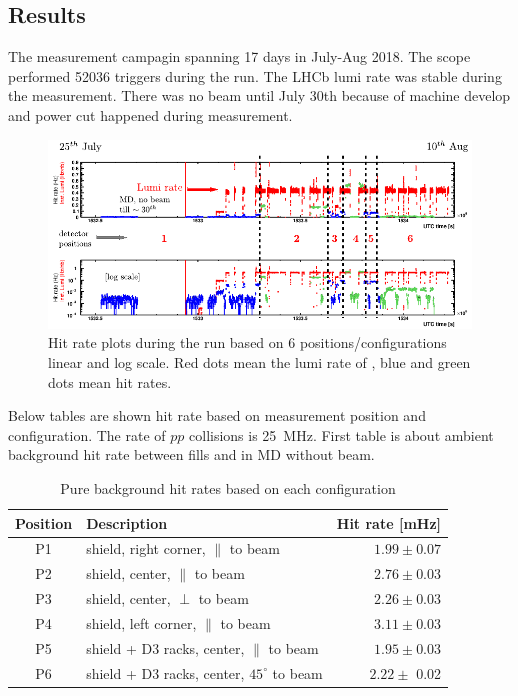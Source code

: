 \subsection{Results}

The measurement campagin spanning 17 days in July-Aug 2018.
The scope performed 52036 triggers during the run.
The LHCb lumi rate was stable during the measurement.
There was no beam until July 30th because of machine develop and power cut happened during measurement.

\vspace{0.2cm}
\begin{figure}[h]
\centering
    \includegraphics[width=12cm]{figs/INT/codexb_data_global.pdf}
\caption{
    Hit rate plots during the run based on 6 positions/configurations linear and log scale. Red dots mean the lumi rate of \lhcb, blue and green dots mean hit rates.
}
\end{figure}

Below tables are shown hit rate based on measurement position and configuration.
The rate of $pp$ collisions is 25~MHz.
First table is about ambient background hit rate between fills and in MD without beam.

\begin{table}
\begin{center}
\begin{tabular}{c|l|r}
  Position & \hspace{2cm}Description & Hit rate [mHz] \\
  \hline \hline
   P1 & shield, right corner, $\parallel$ to beam& $1.99\pm0.07$ \\ \hline
   P2 & shield, center, $\parallel$ to beam&  $2.76\pm 0.03$ \\ \hline
   P3 & shield, center, $\perp$ to beam& $ 2.26\pm 0.03$ \\ \hline
   P4 & shield, left corner, $\parallel$ to beam& $ 3.11\pm 0.03$ \\ \hline
   P5 & shield + D3 racks, center, $\parallel$ to beam& $ 1.95\pm 0.03$ \\ \hline
   P6 & shield + D3 racks, center, $45^\circ$ to beam& $ 2.22\pm $ 0.02\\ \hline
\end{tabular}
\caption{
    Pure background hit rates based on each configuration
}
\end{center}
\end{table}

